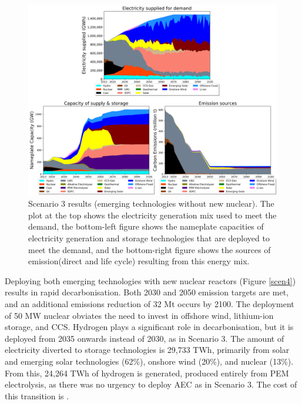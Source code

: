 \begin{figure}[H] 
\centering
\includegraphics[scale=0.5]{figures/newtechs_nonuc}
\caption{Scenario 3 results (emerging technologies without new nuclear). The plot at the top shows the electricity generation mix used to meet the demand, the bottom-left figure shows the nameplate capacities of electricity generation and storage technologies that are deployed to meet the demand, and the bottom-right figure shows the sources of emission(direct and life cycle) resulting from this energy mix.}
\label{scen3}
\end{figure}

Deploying both emerging technologies with new nuclear reactors (Figure \ref{scen4}) results in rapid decarbonisation. Both 2030 and 2050 emission targets are met, and an additional emissions reduction of 32 Mt occurs by 2100. The deployment of 50 MW nuclear obviates the need to invest in offshore wind, lithium-ion storage, and \gls{CCS}. Hydrogen plays a significant role in decarbonisation, but it is deployed from 2035 onwards instead of 2030, as in Scenario 3. The amount of electricity diverted to storage technologies is 29,733 TWh, primarily from solar and emerging solar technologies (62\%), onshore wind (20\%), and nuclear (13\%). From this, 24,264 TWh of hydrogen is generated, produced entirely from PEM electrolysis, as there was no urgency to deploy \gls{AEC} as in Scenario 3. The cost of this transition is \DIFdelbegin \textbf{}%
\DIFdelend \DIFaddbegin {}\DIFaddend .

